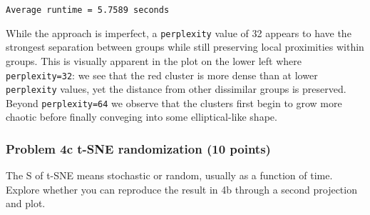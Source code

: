 \documentclass[11pt]{article}
\begin{document}
    \begin{Verbatim}[commandchars=\\\{\}]
Average runtime = 5.7589 seconds

    \end{Verbatim}

    While the approach is imperfect, a \texttt{perplexity} value of 32
appears to have the strongest separation between groups while still
preserving local proximities within groups. This is visually apparent in
the plot on the lower left where \texttt{perplexity=32}: we see that the
red cluster is more dense than at lower \texttt{perplexity} values, yet
the distance from other dissimilar groups is preserved. Beyond
\texttt{perplexity=64} we observe that the clusters first begin to grow
more chaotic before finally conveging into some elliptical-like shape.

    \subsubsection{Problem 4c t-SNE randomization (10
points)}\label{problem-4c-t-sne-randomization-10-points}

The S of t-SNE means stochastic or random, usually as a function of
time. Explore whether you can reproduce the result in 4b through a
second projection and plot.
\end{document}
